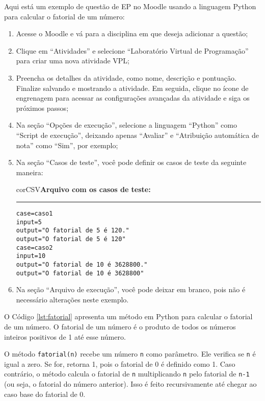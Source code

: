 Aqui está um exemplo de  questão de EP no Moodle usando a linguagem Python para calcular o fatorial de um número:
\begin{enumerate}
    \item Acesse o Moodle e vá para a disciplina em que deseja adicionar a questão;
    \item Clique em ``Atividades'' e selecione ``Laboratório Virtual de Programação''  para criar uma nova atividade VPL;

    \item Preencha os detalhes da atividade, como nome, descrição e pontuação. Finalize salvando e mostrando a atividade. Em seguida, clique no ícone de engrenagem para acessar as configurações avançadas da atividade e siga os próximos passos;

    \item Na seção ``Opções de execução'', selecione a linguagem ``Python'' como ``Script de execução'', deixando apenas ``Avaliar'' e ``Atribuição automática de nota'' como ``Sim'', por exemplo;

    \item Na seção ``Casos de teste'', você pode definir os casos de teste da seguinte maneira:

\begin{myboxCode}{corCSV}{\textbf{Arquivo com os casos de teste:}}\vspace{3mm}
\hrule
\begin{verbatim}
case=caso1
input=5
output="O fatorial de 5 é 120."
output="O fatorial de 5 é 120"
case=caso2
input=10
output="O fatorial de 10 é 3628800."
output="O fatorial de 10 é 3628800"
\end{verbatim}
\end{myboxCode}

    \item Na seção ``Arquivo de execução'', você pode deixar em branco, pois não é necessário alterações neste exemplo.

\end{enumerate}

O Código \ref{lst:fatorial} apresenta um método em Python para calcular o fatorial de um número. O fatorial de um número é o produto de todos os números inteiros positivos de 1 até esse número.

O método \verb|fatorial(n)| recebe um número \verb|n| como parâmetro. Ele verifica se \verb|n| é igual a zero. Se for, retorna 1, pois o fatorial de 0 é definido como 1. Caso contrário, o método calcula o fatorial de \verb|n| multiplicando \verb|n| pelo fatorial de \verb|n-1| (ou seja, o fatorial do número anterior). Isso é feito recursivamente até chegar ao caso base do fatorial de 0.

